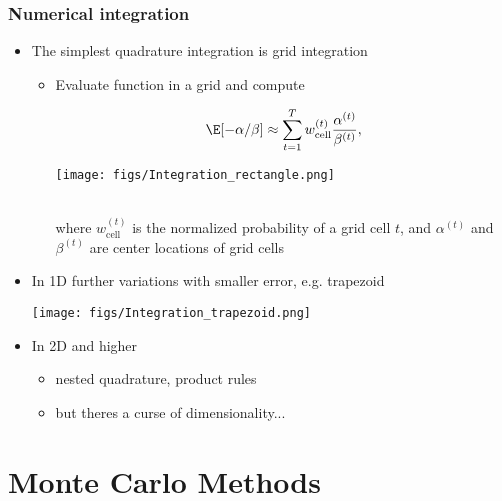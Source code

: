 \documentclass[10pt]{beamer}
\begin{document}
\begin{frame}

\frametitle{Numerical integration}

  \begin{itemize}
  \item The simplest quadrature integration is grid integration
    \begin{itemize}
    \item Evaluate function in a grid and compute\\
    \hspace{-1cm}\begin{minipage}{4cm}
    \begin{align*}
      \E[-\alpha/\beta] \approx \sum_{t=1}^{T} w_{\mathrm{cell}}^{(t)} \frac{\alpha^{(t)}}{\beta^{(t)}},
    \end{align*}
  \end{minipage}
  \begin{minipage}{6cm}
  \texttt{[image: figs/Integration\_rectangle.png]}
\end{minipage}\\
where $w_{\mathrm{cell}}^{(t)}$ is the normalized probability of a grid cell $t$, and $\alpha^{(t)}$ and $\beta^{(t)}$ are center locations of grid cells
\end{itemize}
\item<2-> In 1D further variations with smaller error, e.g. trapezoid
  \begin{center}
    \texttt{[image: figs/Integration\_trapezoid.png]}
  \end{center}
\item<3-> In 2D and higher
  \begin{itemize}
  \item nested quadrature, product rules
  \item but theres a curse of dimensionality...
  \end{itemize}
  \end{itemize}


\end{frame}

\section{Monte Carlo Methods}
\frame{\sectionpage}
\end{document}
